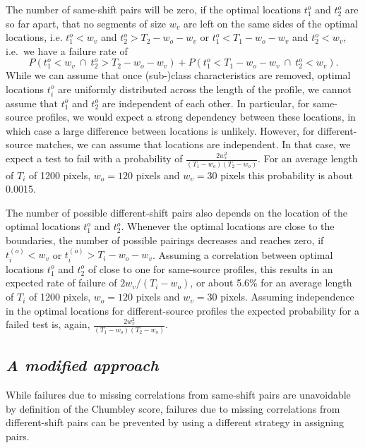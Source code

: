 \documentclass[12pt]{article}
\begin{document}
The number of same-shift pairs will be zero, if the optimal locations
\(t_1^{o}\) and \(t_2^{o}\) are so far apart, that no segments of size
\(w_v\) are left on the same sides of the optimal locations, i.e.
\(t_1^{o} < w_v\) and \(t_2^{o} > T_2-w_o-w_v\) or
\(t_1^{o} < T_1- w_o - w_v\) and \(t_2^{o} < w_v\), i.e.~we have a
failure rate of \[
P\left( t_1^{o} < w_v \ \cap \ t_2^{o} > T_2-w_o-w_v\right) + P\left( t_1^{o} < T_1- w_o - w_v \ \cap \ t_2^{o} < w_v\right).
\] While we can assume that once (sub-)class characteristics are
removed, optimal locations \(t_i^{o}\) are uniformly distributed across
the length of the profile, we cannot assume that \(t_1^o\) and \(t_2^o\)
are independent of each other. In particular, for same-source profiles,
we would expect a strong dependency between these locations, in which
case a large difference between locations is unlikely. However, for
different-source matches, we can assume that locations are independent.
In that case, we expect a test to fail with a probability of
\(\frac{2 w_v^2}{(T_1-w_o)(T_2-w_o)}\). For an average length of \(T_i\)
of 1200 pixels, \(w_o = 120\) pixels and \(w_v = 30\) pixels this
probability is about 0.0015.

The number of possible different-shift pairs also depends on the
location of the optimal locations \(t_1^o\) and \(t_2^o\). Whenever the
optimal locations are close to the boundaries, the number of possible
pairings decreases and reaches zero, if \(t_i^{(o)} < w_v\) or
\(t_i^{(o)} > T_i-w_o- w_v\). Assuming a correlation between optimal
locations \(t_1^o\) and \(t_2^o\) of close to one for same-source
profiles, this results in an expected rate of failure of
\(2 w_v / (T_i-w_o)\), or about 5.6\% for an average length of \(T_i\)
of 1200 pixels, \(w_o = 120\) pixels and \(w_v = 30\) pixels. Assuming
independence in the optimal locations for different-source profiles the
expected probability for a failed test is, again,
\(\frac{2 w_v^2}{(T_1-w_o)(T_2-w_o)}\).

\hypertarget{a-modified-approach}{%
\subsection*{\texorpdfstring{\emph{A modified
approach}}{A modified approach}}\label{a-modified-approach}}

While failures due to missing correlations from same-shift pairs are
unavoidable by definition of the Chumbley score, failures due to missing
correlations from different-shift pairs can be prevented by using a
different strategy in assigning pairs.
\end{document}

